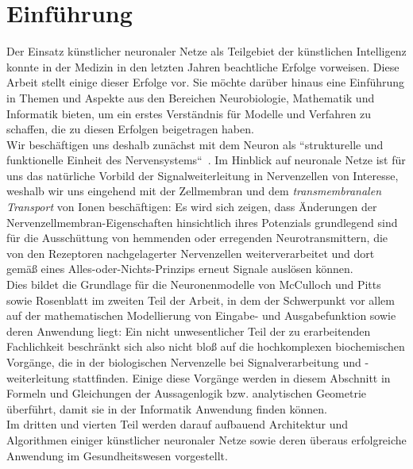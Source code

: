 \chapter{Einführung}

Der Einsatz künstlicher neuronaler Netze als Teilgebiet der künstlichen Intelligenz konnte in der Medizin in den letzten Jahren beachtliche Erfolge vorweisen.
Diese Arbeit stellt einige dieser Erfolge vor.
Sie möchte darüber hinaus eine Einführung in Themen und Aspekte aus den Bereichen Neurobiologie, Mathematik und Informatik bieten, um ein erstes Verständnis für Modelle und Verfahren zu schaffen, die zu diesen Erfolgen beigetragen haben.\\

Wir beschäftigen uns deshalb zunächst mit dem Neuron als ``strukturelle und funktionelle Einheit des Nervensystems``~\cite[42]{SD07}.
Im Hinblick auf neuronale Netze ist für uns das natürliche Vorbild der Signalweiterleitung in Nervenzellen von Interesse, weshalb wir uns eingehend mit der Zellmembran und dem \textit{transmembranalen Transport} von Ionen beschäftigen: Es wird sich zeigen, dass Änderungen der Nervenzellmembran-Eigenschaften hinsichtlich ihres Potenzials grundlegend sind für die Ausschüttung von hemmenden oder erregenden Neurotransmittern, die von den Rezeptoren nachgelagerter Nervenzellen weiterverarbeitet und dort gemäß eines Alles-oder-Nichts-Prinzips erneut Signale auslösen können.\\

Dies bildet die Grundlage für die Neuronenmodelle von McCulloch und Pitts sowie Rosenblatt im zweiten Teil der Arbeit, in dem der Schwerpunkt vor allem auf der mathematischen Modellierung von Eingabe- und Ausgabefunktion sowie deren Anwendung liegt: Ein nicht unwesentlicher Teil der zu erarbeitenden Fachlichkeit beschränkt sich also nicht bloß auf die hochkomplexen biochemischen Vorgänge, die in der biologischen Nervenzelle bei Signalverarbeitung und -weiterleitung stattfinden.
Einige diese Vorgänge werden in diesem Abschnitt in Formeln und Gleichungen der Aussagenlogik {bzw.} analytischen Geometrie überführt, damit sie in der Informatik Anwendung finden können.\\

Im dritten und vierten Teil werden darauf aufbauend Architektur und Algorithmen einiger künstlicher neuronaler Netze sowie deren überaus erfolgreiche Anwendung im Gesundheitswesen vorgestellt.
